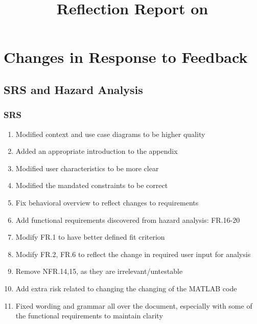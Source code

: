 \documentclass{article}
\title{Reflection Report on \progname}
\author{\authname}
\date{}
\begin{document}
\maketitle


\section{Changes in Response to Feedback}



\subsection{SRS and Hazard Analysis}
\subsubsection{SRS}
\begin{enumerate}
    \item Modified context and use case diagrams to be higher quality
    \item Added an appropriate introduction to the appendix
    \item Modified user characteristics to be more clear
    \item Modified the mandated constraints to be correct
    \item Fix behavioral overview to reflect changes to requirements
    \item Add functional requirements discovered from hazard analysis: FR.16-20
    \item Modify FR.1 to have better defined fit criterion
    \item Modify FR.2, FR.6 to reflect the change in required user input for analysis
    \item Remove NFR.14,15, as they are irrelevant/untestable
    \item Add extra risk related to changing the changing of the MATLAB code
    \item Fixed wording and grammar all over the document, especially with some of the 
    functional requirements to maintain clarity
\end{enumerate}
\end{document}
